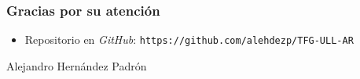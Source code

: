 \begin{frame} [fragile]
  \frametitle{Gracias por su atención}
  \block{\ULLAR}
    \begin{itemize}
    \item Repositorio en {\it GitHub}: \texttt{https://github.com/alehdezp/TFG-ULL-AR}
    \end{itemize}
    \begin{flushright}
    Alejandro Hernández Padrón  \\
    \end{flushright}
  \endblock{}
\end{frame}